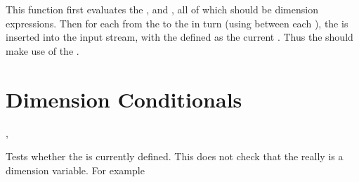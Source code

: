 \documentclass[oneside]{book}
\begin{document}
\begin{function}{\DimStepVariable}
\begin{syntax}
     
\end{syntax}
This function first evaluates the , 
and , all of which should be dimension expressions.
Then for each  from the  to the
 in turn (using  between each
), the  is inserted into the input stream,
with the  defined as the current .  Thus
the  should make use of the .
\end{function}

\section{Dimension Conditionals}

\begin{function}{\DimIfExist,\DimIfExistTF}
\begin{syntax}
 
   
\end{syntax}
Tests whether the  is currently defined.  This does
not check that the  really is a dimension variable.
For example
\begin{demohigh}
\DimIfExistTF {} {}
\DimIfExistTF {} {}
\end{demohigh}
\end{function}
\end{document}
